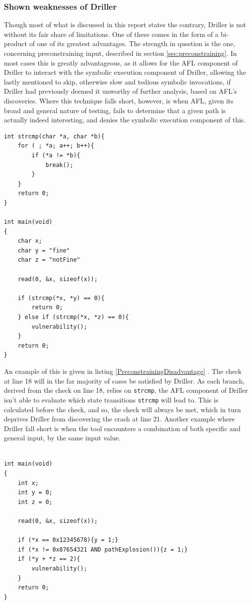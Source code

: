 \documentclass[a4paper]{article}
\newcommand{\ttt}[1]{\texttt{#1}}
\begin{document}
\subsubsection{Shown weaknesses of Driller}
\label{sec:DrillerWeaknesses}
Though most of what is discussed in this report states the contrary, Driller is not without its fair share of limitations. One of these comes in the form of a bi-product of one of its greatest advantages. The strength in question is the one, concerning preconstraining input, described in section \ref{sec:preconstraining}. In most cases this is greatly advantageous, as it allows for the AFL component of Driller to interact with the symbolic execution component of Driller, allowing the lastly mentioned to skip, otherwise slow and tedious symbolic invocations, if Driller had previously deemed it unworthy of further analysis, based on AFL's discoveries. Where this technique falls short, however, is when AFL, given its broad and general nature of testing, fails to determine that a given path is actually indeed interesting, and denies the symbolic execution component of this.
\begin{lstlisting}[caption=An example of preconstraining being a disadvantage,
label=PreconstrainingDisadvantage, captionpos=b]
int strcmp(char *a, char *b){
    for ( ; *a; a++; b++){
        if (*a != *b){
            break();
        }
    }
    return 0;
}

int main(void)
{
    char x;
    char y = "fine"
    char z = "notFine"
    
    read(0, &x, sizeof(x));
    
    if (strcmp(*x, *y) == 0){
        return 0;
    } else if (strcmp(*x, *z) == 0){
        vulnerability();
    }
    return 0;
}
\end{lstlisting}
An example of this is given in listing \ref{PreconstrainingDisadvantage} \cite[p.14]{Driller}. The check at line 18 will in the far majority of cases be satisfied by Driller. As each branch, derived from the check on line 18, relies on \ttt{strcmp}, the AFL component of Driller isn't able to evaluate which state transitions \ttt{strcmp} will lead to. This is calculated before the check, and so, the check will always be met, which in turn deprives Driller from discovering the crash at line 21.
\newpage
Another example where Driller fall short is when the tool encounters a combination of both specific and general input, by the same input value. 
\begin{lstlisting}[caption=An example of Driller being outmanoeuvred by specific and general input,
label=GeneralSpecific, captionpos=b]

int main(void)
{
    int x;
    int y = 0;
    int z = 0;

    read(0, &x, sizeof(x));
    
    if (*x == 0x12345678){y = 1;}
    if (*x != 0x87654321 AND pathExplosion()){z = 1;}
    if (*y + *z == 2){
        vulnerability();
    }
    return 0;
}
\end{lstlisting}
\end{document}
